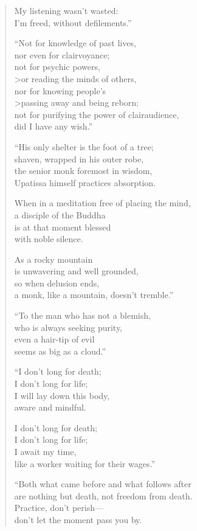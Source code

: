 \documentclass[12pt,openany]{book}%
\begin{document}
\begin{verse}
My listening wasn’t wasted: \\
I’m freed, without defilements.” 

“Not for knowledge of past lives, \\
nor even for clairvoyance; \\
not for psychic powers, \\>or reading the minds of others, \\
nor for knowing people’s \\>passing away and being reborn; \\
not for purifying the power of clairaudience, \\
did I have any wish.” 

“His only shelter is the foot of a tree; \\
shaven, wrapped in his outer robe, \\
the senior monk foremost in wisdom, \\
Upatissa himself practices absorption. 

When in a meditation  free of placing the mind, \\
a disciple of the Buddha \\
is at that moment blessed \\
with noble silence. 

As a rocky mountain \\
is unwavering and well grounded, \\
so when delusion ends, \\
a monk, like a mountain, doesn’t tremble.” 

“To the man who has not a blemish, \\
who is always seeking purity, \\
even a hair-tip of evil \\
seems as big as a cloud.” 

“I don’t long for death; \\
I don’t long for life; \\
I will lay down this body, \\
aware and mindful. 

I don’t long for death; \\
I don’t long for life; \\
I await my time, \\
like a worker waiting for their wages.” 

“Both what came before and what follows after \\
are nothing but death, not freedom from death. \\
Practice, don’t perish—\\
don’t let the moment pass you by. 


\end{verse}
\end{document}
